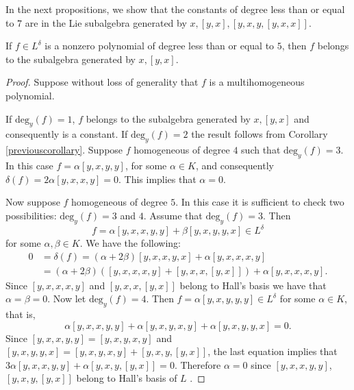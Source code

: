\documentclass{cimart}
\begin{document}
In the next propositions, we show that the constants of degree less than or equal to $7$ are in the Lie subalgebra generated by $x, [y, x], [y, x, y, [y, x, x]]$.

\begin{proposition}If  $f \in L^\delta$  is a nonzero polynomial of degree less than or equal to $5$, then $f $ belongs to the subalgebra generated by $x, [y, x]$.
\end{proposition}
\begin{proof} Suppose without loss of generality that $f$ is a multihomogeneous polynomial.

If $\mbox{deg}_y(f) = 1$, $f $ belongs to the subalgebra generated by $x, [y, x]$ and consequently is a constant. If $\mbox{deg}_y(f) = 2$ the result follows from Corollary \ref{previouscorollary}.
Suppose $f$ homogeneous of degree $4$ such that $\mbox{deg}_y(f) = 3$. In this case $f = \alpha [y, x, y, y]$, for some $\alpha\in K$, and consequently $\delta(f) = 2 \alpha [y,x, x, y ] = 0$. This implies that $\alpha = 0$. 

Now suppose $f$ homogeneous of degree $5$. In this case it is sufficient to check two possibilities: $\mbox{deg}_y(f) = 3$ and $4$.
Assume that $\mbox{deg}_y(f) = 3$. Then
\[
f=\alpha [y, x, x, y, y] + \beta [y, x, y, y, x] \in L^\delta
\]
for some $\alpha,\beta\in K$. We have the following:
\begin{align}
0&=\delta(f)=(\alpha + 2\beta)[y, x, x, y, x] + \alpha[y, x, x, x, y]\nonumber\\
&= (\alpha + 2\beta)([y, x, x, x, y] + [y, x, x, [y, x]]) + \alpha[y, x, x, x, y].\nonumber
\end{align}
Since $[y, x, x, x, y]$ and $[y, x, x, [y, x]]$ belong to Hall's basis we have that $\alpha = \beta = 0$.
Now let $\mbox{deg}_y(f) =4$. Then $f=\alpha [y, x, y, y, y] \in L ^\delta$ for some $\alpha\in K$, that is, 
\[
\alpha [y, x, x, y, y] + \alpha [y, x, y, x, y] + \alpha [y, x, y, y, x] = 0.
\]
Since $[y, x, x, y, y] = [y, x, y, x, y]$ and $[y, x, y, y, x] = [y, x, y, x, y] + [y, x, y, [y, x]]$, the last equation implies that $3\alpha [y, x, x, y, y] + \alpha[y, x, y, [y,x]] = 0$. Therefore $\alpha = 0$ since $ [y, x, x, y, y]$, $[y, x, y, [y, x]]$ belong to Hall's basis of $L$ . 
\end{proof}
\end{document}
